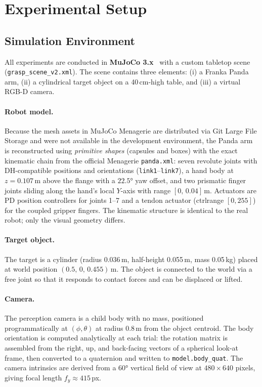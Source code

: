 \documentclass[journal]{IEEEtran}
\begin{document}
\section{Experimental Setup}
\label{sec:experiments}

\subsection{Simulation Environment}
\label{sec:sim_env}

All experiments are conducted in \textbf{MuJoCo 3.x}~\cite{todorov2012mujoco}
with a custom tabletop scene (\texttt{grasp\_scene\_v2.xml}).  The scene
contains three elements: (i) a Franka Panda arm, (ii) a cylindrical target
object on a 40\,cm-high table, and (iii) a virtual RGB-D camera.

\paragraph{Robot model.}
Because the mesh assets in MuJoCo Menagerie are distributed via Git Large
File Storage and were not available in the development environment, the Panda
arm is reconstructed using \emph{primitive shapes} (capsules and boxes) with
the exact kinematic chain from the official Menagerie \texttt{panda.xml}:
seven revolute joints with DH-compatible positions and orientations
(\texttt{link1}--\texttt{link7}), a hand body at $z=0.107$\,m above the
flange with a $22.5°$ yaw offset, and two prismatic finger joints sliding
along the hand's local $Y$-axis with range $[0,\,0.04]$\,m.  Actuators are
PD position controllers for joints 1--7 and a tendon actuator (ctrlrange
$[0,255]$) for the coupled gripper fingers.  The kinematic structure is
identical to the real robot; only the visual geometry differs.

\paragraph{Target object.}
The target is a cylinder (radius 0.036\,m, half-height 0.055\,m,
mass 0.05\,kg) placed at world position $(0.5,\,0,\,0.455)$\,m.
The object is connected to the world via a free joint so that it
responds to contact forces and can be displaced or lifted.

\paragraph{Camera.}
The perception camera is a child body with no mass, positioned
programmatically at $(\phi,\theta)$ at radius 0.8\,m from the object
centroid.  The body orientation is computed analytically at each trial:
the rotation matrix is assembled from the right, up, and back-facing
vectors of a spherical look-at frame, then converted to a quaternion
and written to \texttt{model.body\_quat}.  The camera intrinsics are
derived from a 60° vertical field of view at $480\times640$ pixels,
giving focal length $f_y \approx 415$\,px.
\end{document}
